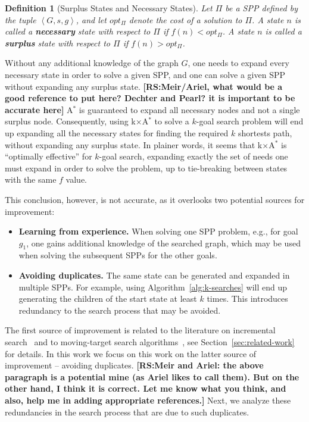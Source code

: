 \documentclass{aicom2e}
\newtheorem{definition}{Definition}
\newcommand{\kgs}{$k$-goal search}
\newcommand{\astar}{A$^*$}
\newcommand{\kxastar}{k$\times$A$^*$}
\newcommand{\tuple}[1]{\ensuremath{\left \langle #1 \right \rangle }}
\newcommand{\roni}[1]{\textbf{[RS:#1]}}
\begin{document}
\begin{definition}[Surplus States and Necessary States]
	Let $\Pi$ be a SPP defined by the tuple $\tuple{G,s,g}$, and let $opt_\Pi$ denote the cost of a solution to $\Pi$. 
	A state $n$ is called a {\bf necessary} state with respect to $\Pi$ if $f(n)<opt_\Pi$. 
	A state $n$ is called a {\bf surplus} state with respect to $\Pi$ if $f(n)>opt_\Pi$. 
\label{def:surplus}
\end{definition}
Without any additional knowledge of the graph $G$, one needs to expand every necessary state in order to solve a given SPP, 
and one can solve a given SPP without expanding any surplus state. \roni{Meir/Ariel, what would be a good reference to put here? Dechter and Pearl? it is important to be accurate here}
\astar{} is guaranteed to expand all necessary nodes and not a single surplus node. Consequently, 
using \kxastar{} to solve a \kgs{} problem will end up expanding all the necessary states 
for finding the required $k$ shortests path, without expanding any surplus state. 
In plainer words, it seems that \kxastar{} is ``optimally effective'' for \kgs{}, 
expanding exactly the set of needs one must expand in order to solve the problem, up to tie-breaking between states with the same $f$ value. 


This conclusion, however, is not accurate, as it overlooks two potential sources for improvement:
\begin{itemize}
	\item {\bf Learning from experience.} When solving one SPP problem, e.g., for goal $g_1$, one gains additional knowledge of the searched graph, which may be used when solving the subsequent SPPs for the other goals.
	\item {\bf Avoiding duplicates.} The same state can be generated and expanded in multiple SPPs. For example, using Algorithm~\ref{alg:k-searches} will end up generating the children of the start state at least $k$ times. This introduces redundancy to the search process that may be avoided.  
\end{itemize}
The first source of improvement is related to the literature on incremental search~\cite{koenig2004lifelong} and to moving-target search algorithms~\cite{ishida1995moving,koenig2007speeding}, see Section~\ref{sec:related-work} for details. In this work we focus on this work on the latter source of improvement -- avoiding duplicates. %
\roni{Meir and Ariel: the above paragraph is a potential mine (as Ariel likes to call them). But on the other hand, I think it is correct. Let me know what you think, and also, help me in adding appropriate references.}
Next, we analyze these redundancies in the search process that are due to such duplicates. 
\end{document}
